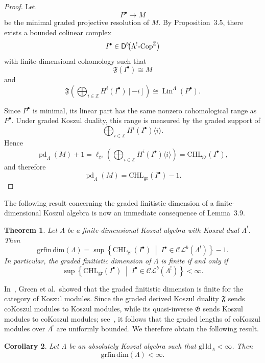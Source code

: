 \documentclass[11pt]{article}
\newtheorem{theorem}{Theorem}[section]
\newtheorem{corollary}[theorem]{Corollary}
\theoremstyle{definition}
\theoremstyle{remark}
\begin{document}
\begin{proof}
Let
\[
P^{\bullet}\longrightarrow M
\]
be the minimal graded projective resolution of \(M\). By Proposition~3.5,
there exists a bounded colinear complex
\[
I^{\bullet}\in
\mathsf{D}^{b}\!\bigl(
\Lambda^{!}\textup{-}\mathrm{Cop}^{\mathbb{Z}}
\bigr)
\]
with finite-dimensional cohomology such that
\[
\mathfrak{F}(I^{\bullet})\cong M
\]
and
\[
\mathfrak{F}\!\left(
\bigoplus_{i\in\mathbb Z}
H^{i}(I^{\bullet})[-i]
\right)
\cong
\operatorname{Lin}^{\Lambda}(P^{\bullet}).
\]

Since \(P^{\bullet}\) is minimal, its linear part has the same nonzero
cohomological range as \(P^{\bullet}\). Under graded Koszul duality, this
range is measured by the graded support of
\[
\bigoplus_{i\in\mathbb Z}
H^{i}(I^{\bullet})\langle i\rangle.
\]
Hence
\[
\operatorname{pd}_{\Lambda}(M)+1
=
\ell_{\mathrm{gr}}\!\left(
\bigoplus_{i\in\mathbb Z}
H^{i}(I^{\bullet})\langle i\rangle
\right)
=
\mathrm{CHL}_{\mathrm{gr}}(I^{\bullet}),
\]
and therefore
\[
\operatorname{pd}_{\Lambda}(M)
=
\mathrm{CHL}_{\mathrm{gr}}(I^{\bullet})-1.
\]
\end{proof}
The following result concerning the graded finitistic dimension of a finite-dimensional Koszul algebra is now an immediate consequence of Lemma~3.9.

\begin{theorem}
Let \(\Lambda\) be a finite-dimensional Koszul algebra with Koszul dual \(\Lambda^{!}\). Then
\[
\mathrm{grfin\,dim}(\Lambda)
=
\sup
\left\{
\mathrm{CHL}_{\mathrm{gr}}(I^{\bullet})
\;\middle|\;
I^{\bullet}\in
\mathcal{CL}^{b}(\Lambda^{!})
\right\}
-1.
\]
In particular, the graded finitistic dimension of \(\Lambda\) is finite if and only if
\[
\sup
\left\{
\mathrm{CHL}_{\mathrm{gr}}(I^{\bullet})
\;\middle|\;
I^{\bullet}\in
\mathcal{CL}^{b}(\Lambda^{!})
\right\}
< \infty.
\]
\end{theorem}
In~\cite{12}, Green et al.\ showed that the graded finitistic dimension is finite for the category of Koszul modules. Since the graded derived Koszul duality \(\mathfrak{F}\) sends coKoszul modules to Koszul modules, while its quasi-inverse \(\mathfrak{G}\) sends Koszul modules to coKoszul modules; see~\cite[Proposition~3.1]{5}, it follows that the graded lengths of coKoszul modules over \(\Lambda^{!}\) are uniformly bounded. We therefore obtain the following result.

\begin{corollary}
Let \(\Lambda\) be an absolutely Koszul algebra such that \(\mathrm{gl\,ld}_{\Lambda}<\infty\). Then
\[
\mathrm{grfin\,dim}(\Lambda)<\infty.
\]
\end{corollary}
\end{document}

